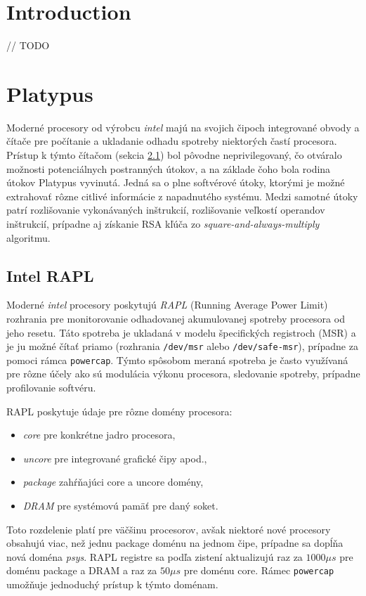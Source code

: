 \newcommand{\code}{\texttt}

\chapter{Introduction}
// TODO

\chapter{Platypus}
Moderné procesory od výrobcu \emph{intel} majú na svojich čipoch integrované obvody a čítače pre počítanie a ukladanie odhadu spotreby niektorých častí procesora.
Prístup k týmto čítačom (sekcia \ref{sec:rapl}) bol pôvodne neprivilegovaný, čo otváralo možnosti potenciálnych postranných útokov, a na základe čoho bola rodina útokov
Platypus vyvinutá. Jedná sa o plne softvérové útoky, ktorými je možné extrahovať rôzne citlivé informácie z napadnutého systému. Medzi samotné útoky
patrí rozlišovanie vykonávaných inštrukcií, rozlišovanie veľkostí operandov inštrukcií, prípadne aj získanie RSA kľúča zo \emph{square-and-always-multiply} algoritmu.

\section{Intel RAPL} \label{sec:rapl}
Moderné \emph{intel} procesory poskytujú \emph{RAPL} (Running Average Power Limit) rozhrania pre monitorovanie odhadovanej akumulovanej spotreby procesora
od jeho resetu. Táto spotreba je ukladaná v modelu špecifických registroch (MSR) a je ju možné čítať priamo (rozhrania \code{/dev/msr} alebo \code{/dev/safe-msr}),
prípadne za pomoci rámca \code{powercap}. Týmto spôsobom meraná spotreba je často využívaná pre rôzne účely ako sú modulácia výkonu procesora,
sledovanie spotreby, prípadne profilovanie softvéru.

RAPL poskytuje údaje pre rôzne domény procesora:
\begin{itemize}
    \item \emph{core} pre konkrétne jadro procesora,
    \item \emph{uncore} pre integrované grafické čipy apod.,
    \item \emph{package} zahŕňajúci core a uncore domény,
    \item \emph{DRAM} pre systémovú pamäť pre daný soket.
\end{itemize}
Toto rozdelenie platí pre väčšinu procesorov, avšak niektoré nové procesory obsahujú viac, než jednu package doménu na jednom čipe, prípadne sa dopĺňa
nová doména \emph{psys}. %
RAPL registre sa podľa zistení \cite{Platypus} aktualizujú raz za $1000 \mu s$ pre doménu package a DRAM a raz za $50 \mu s$ pre doménu core.
Rámec \code{powercap} umožňuje jednoduchý prístup k týmto doménam.

